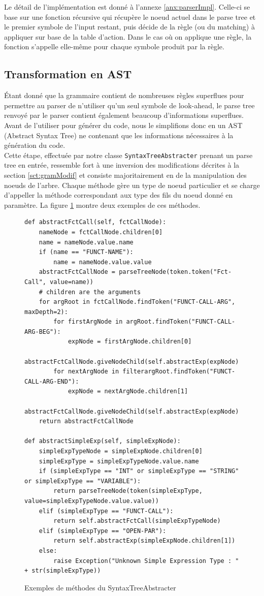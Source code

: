 \documentclass[a4paper,10pt]{article}
\begin{document}
Le détail de l'implémentation est donné à l'annexe \ref{anx:parserImpl}. Celle-ci se base sur une fonction récursive qui récupère le noeud actuel dans le parse tree et le premier symbole de l'input restant, puis décide de la règle (ou du matching) à appliquer sur base de la table d'action. Dans le cas où on applique une règle, la fonction s'appelle elle-même pour chaque symbole produit par la règle.

\subsection{Transformation en AST}

Étant donné que la grammaire contient de nombreuses règles superflues pour permettre au parser de n'utiliser qu'un seul symbole de look-ahead, le parse tree renvoyé par le parser contient également beaucoup d'informations superflues. Avant de l'utiliser pour générer du code, nous le simplifions donc en un AST (Abstract Syntax Tree) ne contenant que les informations nécessaires à la génération du code.\\

Cette étape, effectuée par notre classe \verb?SyntaxTreeAbstracter? prenant un parse tree en entrée, ressemble fort à une inversion des modifications décrites à la section \ref{sct:gramModif} et consiste majoritairement en de la manipulation des noeuds de l'arbre. Chaque méthode gère un type de noeud particulier et se charge d'appeller la méthode correspondant aux type des fils du noeud donné en paramètre. La figure \ref{lst:ex_STA} montre deux exemples de ces méthodes.

\begin{figure}[H]
\begin{lstlisting}
def abstractFctCall(self, fctCallNode):
	nameNode = fctCallNode.children[0]
	name = nameNode.value.name
	if (name == "FUNCT-NAME"):
		name = nameNode.value.value
	abstractFctCallNode = parseTreeNode(token.token("Fct-Call", value=name))
	# children are the arguments
	for argRoot in fctCallNode.findToken("FUNCT-CALL-ARG", maxDepth=2):
		for firstArgNode in argRoot.findToken("FUNCT-CALL-ARG-BEG"):
			expNode = firstArgNode.children[0]
			abstractFctCallNode.giveNodeChild(self.abstractExp(expNode))
		for nextArgNode in filterargRoot.findToken("FUNCT-CALL-ARG-END"):
			expNode = nextArgNode.children[1]
			abstractFctCallNode.giveNodeChild(self.abstractExp(expNode))
	return abstractFctCallNode

def abstractSimpleExp(self, simpleExpNode):
	simpleExpTypeNode = simpleExpNode.children[0]
	simpleExpType = simpleExpTypeNode.value.name
	if (simpleExpType == "INT" or simpleExpType == "STRING" or simpleExpType == "VARIABLE"):
		return parseTreeNode(token(simpleExpType, value=simpleExpTypeNode.value.value))
	elif (simpleExpType == "FUNCT-CALL"):
		return self.abstractFctCall(simpleExpTypeNode)
	elif (simpleExpType == "OPEN-PAR"):
		return self.abstractExp(simpleExpNode.children[1])
	else:
		raise Exception("Unknown Simple Expression Type : " + str(simpleExpType))
\end{lstlisting}
\fontfamily{}
\caption{Exemples de méthodes du SyntaxTreeAbstracter}
\label{lst:ex_STA}
\end{figure}
\end{document}
